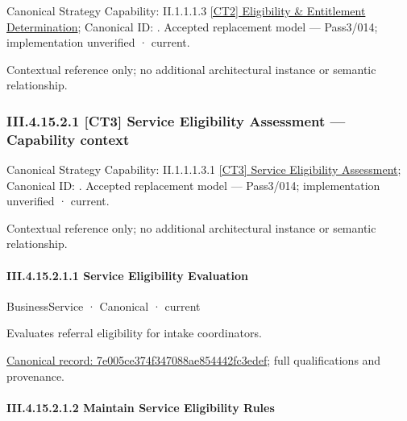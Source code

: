 {\small Canonical Strategy Capability: II.1.1.1.3 \hyperref[element:2239340b964c49bab172d8c5cf4ba4cd]{[CT2] Eligibility \& Entitlement Determination}; Canonical ID: \texttt{}. Accepted replacement model — Pass3/014; implementation unverified · current.}\par
Contextual reference only; no additional architectural instance or semantic relationship.\par
\subsubsection*{III.4.15.2.1 [CT3] Service Eligibility Assessment — Capability context}
\label{navigation:III.4.15.2.1}

{\small Canonical Strategy Capability: II.1.1.1.3.1 \hyperref[element:94d9c75393684e638e5c3b1c83ed99be]{[CT3] Service Eligibility Assessment}; Canonical ID: \texttt{}. Accepted replacement model — Pass3/014; implementation unverified · current.}\par
Contextual reference only; no additional architectural instance or semantic relationship.\par
\paragraph*{III.4.15.2.1.1 Service Eligibility Evaluation}
\label{navigation:III.4.15.2.1.1}

\label{element:7e005ce374f347088ae854442fc3edef}
{\small BusinessService · Canonical · current}\par

Evaluates referral eligibility for intake coordinators.


{\footnotesize \href{../../../../../../../../continuum/business/business-service/7e005ce374f347088ae854442fc3edef.md}{Canonical record: 7e005ce374f347088ae854442fc3edef}; full qualifications and provenance.}\par
\paragraph*{III.4.15.2.1.2 Maintain Service Eligibility Rules}
\label{navigation:III.4.15.2.1.2}

